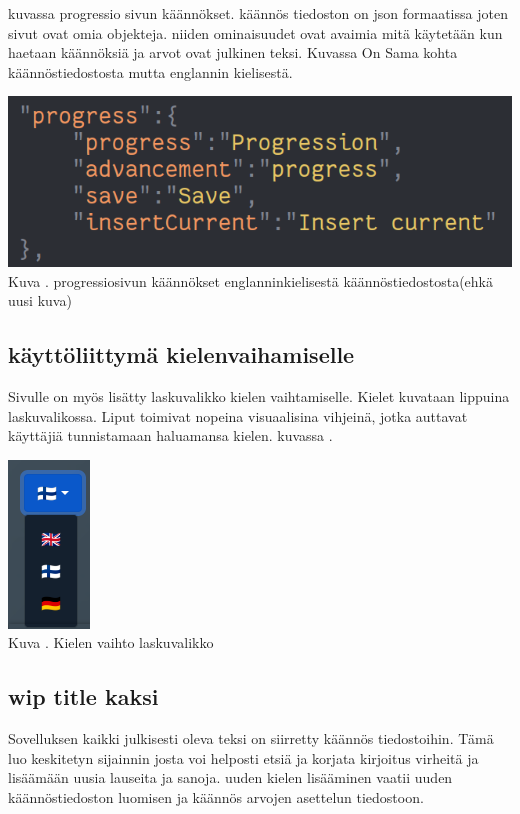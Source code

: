 \documentclass[11pt,a4paper,titlepage,oneside]{article}
\begin{document}
kuvassa progressio sivun käännökset. käännös tiedoston on json formaatissa joten sivut ovat omia objekteja. 
niiden ominaisuudet ovat avaimia mitä käytetään kun haetaan käännöksiä ja arvot ovat julkinen teksi.
Kuvassa \nextImageCount {} On Sama kohta käännöstiedostosta mutta englannin kielisestä.
\bigskip


\includegraphics[width = 15cm]{src/public/oppar/translationfileEng.png}\\
Kuva \getImgCount {}. progressiosivun käännökset englanninkielisestä käännöstiedostosta(ehkä uusi kuva)
\medskip




\subsection{käyttöliittymä kielenvaihamiselle}

Sivulle on myös lisätty laskuvalikko kielen vaihtamiselle. 
Kielet kuvataan lippuina laskuvalikossa.
Liput toimivat nopeina visuaalisina vihjeinä, jotka auttavat käyttäjiä tunnistamaan haluamansa kielen.
kuvassa \nextImageCount.



\bigskip
\includegraphics[]{src/public/locale_laskuvalikko.png}\\
Kuva \getImgCount {}. Kielen vaihto laskuvalikko


\subsection{wip title kaksi}
Sovelluksen kaikki julkisesti oleva teksi on siirretty käännös tiedostoihin. 
Tämä luo keskitetyn sijainnin josta voi helposti etsiä ja korjata kirjoitus virheitä ja lisäämään uusia lauseita ja sanoja.
uuden kielen lisääminen vaatii uuden käännöstiedoston luomisen ja käännös arvojen asettelun tiedostoon.
\medskip
\end{document}
